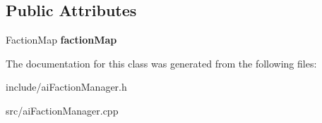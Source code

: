 \subsection*{\-Public \-Attributes}
\begin{DoxyCompactItemize}
\item 
\hypertarget{classAIFactionManager_a55705e870cabc093ce8c83ce122944c3}{
\-Faction\-Map {\bfseries faction\-Map}}
\label{d2/db2/classAIFactionManager_a55705e870cabc093ce8c83ce122944c3}

\end{DoxyCompactItemize}


\-The documentation for this class was generated from the following files\-:\begin{DoxyCompactItemize}
\item 
include/ai\-Faction\-Manager.\-h\item 
src/ai\-Faction\-Manager.\-cpp\end{DoxyCompactItemize}
